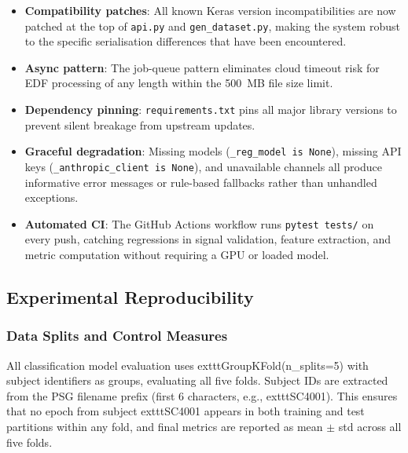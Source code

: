 \documentclass[10pt]{article}
\begin{document}
\begin{itemize}
  \item \textbf{Compatibility patches}: All known Keras version incompatibilities are now patched at the top of \texttt{api.py} and \texttt{gen\_dataset.py}, making the system robust to the specific serialisation differences that have been encountered.
  \item \textbf{Async pattern}: The job-queue pattern eliminates cloud timeout risk for EDF processing of any length within the 500~MB file size limit.
  \item \textbf{Dependency pinning}: \texttt{requirements.txt} pins all major library versions to prevent silent breakage from upstream updates.
  \item \textbf{Graceful degradation}: Missing models (\texttt{\_reg\_model is None}), missing API keys (\texttt{\_anthropic\_client is None}), and unavailable channels all produce informative error messages or rule-based fallbacks rather than unhandled exceptions.
  \item \textbf{Automated CI}: The GitHub Actions workflow runs \texttt{pytest tests/} on every push, catching regressions in signal validation, feature extraction, and metric computation without requiring a GPU or loaded model.
\end{itemize}

\subsection{Experimental Reproducibility}
\label{sec:experimentalReproducibility}

\subsubsection{Data Splits and Control Measures}
\label{sec:dataSplits}

All classification model evaluation uses 	exttt{GroupKFold(n\_splits=5)} with subject identifiers as groups, evaluating all five folds. Subject IDs are extracted from the PSG filename prefix (first 6 characters, e.g., 	exttt{SC4001}). This ensures that no epoch from subject 	exttt{SC4001} appears in both training and test partitions within any fold, and final metrics are reported as mean $\pm$ std across all five folds.
\end{document}
